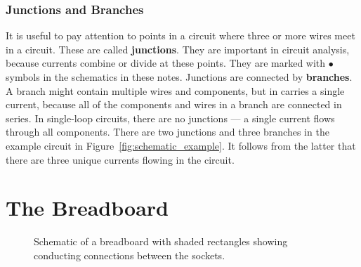 \documentclass[11pt]{article}
\begin{document}
\subsubsection*{Junctions and Branches}

It is useful to pay attention to points in a circuit where three or
more wires meet in a circuit. These are called
\textbf{junctions}. They are important in circuit  
analysis, because currents combine or divide at these points. They are
marked with $\bullet$ symbols in the schematics in these notes.
Junctions are connected by \textbf{branches}. A branch might
contain multiple wires and components, but in carries a single
current, because all of the components and wires in a branch are
connected in series. In single-loop circuits, there are no junctions
--- a single current flows through all components. There are two
junctions and three branches in the example circuit in
Figure~\ref{fig:schematic_example}. It follows from the latter that
there are three unique currents flowing in the circuit.

\section{The Breadboard}
\label{sec:breadboard}

\begin{figure}[ht]
  \begin{center}
    \caption{Schematic of a breadboard with shaded rectangles showing
      conducting connections between the sockets.}
    \label{fig:breadboard}
  \end{center}
\end{figure}
\end{document}
